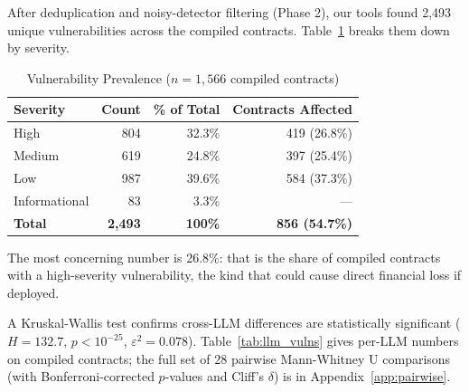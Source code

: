 \documentclass[11pt]{article}
\begin{document}
After deduplication and noisy-detector filtering (Phase 2), our tools found 2,493 unique vulnerabilities across the compiled contracts. Table~\ref{tab:overall} breaks them down by severity.

\begin{table}[H]
\centering
\caption{Vulnerability Prevalence ($n=1{,}566$ compiled contracts)}
\label{tab:overall}
\begin{tabular}{@{}lrrr@{}}
\toprule
\textbf{Severity} & \textbf{Count} & \textbf{\% of Total} & \textbf{Contracts Affected} \\
\midrule
High & 804 & 32.3\% & 419 (26.8\%) \\
Medium & 619 & 24.8\% & 397 (25.4\%) \\
Low & 987 & 39.6\% & 584 (37.3\%) \\
Informational & 83 & 3.3\% & --- \\
\midrule
\textbf{Total} & \textbf{2{,}493} & \textbf{100\%} & \textbf{856 (54.7\%)} \\
\bottomrule
\end{tabular}
\end{table}

The most concerning number is 26.8\%: that is the share of compiled contracts with a high-severity vulnerability, the kind that could cause direct financial loss if deployed.

A Kruskal-Wallis test confirms cross-LLM differences are statistically significant ($H=132.7$, $p<10^{-25}$, $\varepsilon^2 = 0.078$). Table~\ref{tab:llm_vulns} gives per-LLM numbers on compiled contracts; the full set of 28 pairwise Mann-Whitney U comparisons (with Bonferroni-corrected $p$-values and Cliff's $\delta$) is in Appendix~\ref{app:pairwise}.
\end{document}
